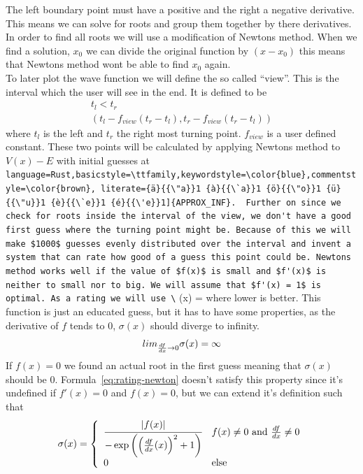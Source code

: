 \documentclass[11pt,DIV=10,final]{scrreprt} %
\providecommand{\rustinline}{\lstinline[language=Rust,basicstyle=\ttfamily,keywordstyle=\color{blue},commentstyle=\color{brown}, literate={ä}{{\"a}}1 {à}{{\`a}}1 {ö}{{\"o}}1 {ü}{{\"u}}1 {è}{{\`e}}1 {é}{{\'e}}1]} % für Inline-C++ Code
\newcommand{\deriv}[2]{%
  \frac{d#1}{d#2}
}
\begin{document}
The left boundary point must have a positive and the right a negative derivative. This means we can solve for roots and group them together by there derivatives.
\\
In order to find all roots we will use a modification of Newtons method. When we find a solution, $x_{0}$ we can divide the original function by $(x - x_{0})$ this means that Newtons method wont be able to find $x_{0}$ again.
\\
\label{sec:view}
To later plot the wave function we will define the so called ``view''. This is the interval which the user will see in the end.
It is defined to be
\begin{align*}
  t_{l} < t_{r} \\
  \left(t_{l} - f_{view} (t_{r} - t_{l}), t_{r} - f_{view} (t_{r} - t_{l})\right)
\end{align*}
where $t_{l}$ is the left and $t_{r}$ the right most turning point. $f_{view}$ is a user defined constant.
These two points will be calculated by applying Newtons method to $V(x) - E$ with initial guesses at \rustinline{APPROX_INF}.

Further on since we check for roots inside the interval of the view, we don't
have a good first guess where the turning point might be. Because of this we will make $1000$
guesses evenly distributed over the interval and invent a system that can rate how good of a
guess this point could be.
Newtons method works well if the value of $f(x)$ is small and $f'(x)$ is neither to small nor to big. We will assume that $f'(x) = 1$ is optimal.
As a rating we will use
\[
  \label{eq:rating-newton}
  \sigma(x) = \cfrac{|f(x)| }{ -\exp\left({{\left(\deriv{f}{x}(x)\right)}^{2} + 1}\right)}
\]
where lower is better. This function is just an educated guess, but it has to have some properties, as the derivative of $f$ tends to 0, $\sigma(x)$ should diverge to infinity.
\[lim_{\deriv{f}{x} \to 0} \sigma(x) = \infty\]
If $f(x) = 0$ we found an actual root in the first guess meaning that $\sigma(x)$ should be 0.
Formula~\ref{eq:rating-newton} doesn't satisfy this property since it's undefined if $f'(x) = 0$ and $f(x) = 0$, but we can extend it's definition such that
\[
  \sigma(x) = \left\{
    \begin{array}{ll}
    \cfrac{|f(x)| }{ -\exp\left({{\left(\deriv{f}{x}(x)\right)}^{2} + 1}\right)} & f(x) \ne 0~\text{and}~\deriv{f}{x} \ne 0 \\
    0 & \text{else}
    \end{array}\right.
\]
\end{document}
